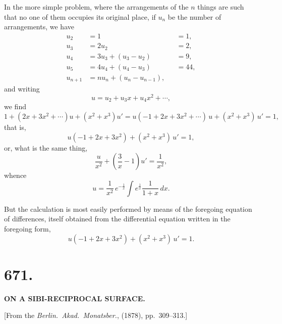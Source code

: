\documentclass[11pt,a4paper]{article}
\begin{document}
\medskip

In the more simple problem, where the arrangements of the $n$ things are such that no one of them occupies its original place, if $u_{n}$ be the number of arrangements, we have
\begin{align*}
u_{2} &= 1 &&= 1,\\
u_{3} &= 2u_{2} &&= 2,\\
u_{4} &= 3u_{3} + (u_{3} - u_{2}) &&= 9,\\
u_{5} &= 4u_{4} + (u_{4} - u_{3}) &&= 44,\\
u_{n+1} &= n u_{n} + (u_{n} - u_{n-1}),
\end{align*}
and writing
\[
u = u_{2} + u_{3}x + u_{4}x^{2} + \cdots,
\]
we find
\[
1 + (2x + 3x^{2} + \cdots)u + (x^{2} + x^{3})u' = u(-1 + 2x + 3x^{2} + \cdots)\,u + (x^{2} + x^{3})\,u' = 1,
\]
that is,
\[
u\left(-1 + 2x + 3x^{2}\right) + (x^{2} + x^{3})\,u' = 1,
\]
or, what is the same thing,
\[
\frac{u}{x^{2}} + \left(\frac{3}{x} - 1\right)u' = \frac{1}{x^{2}},
\]
whence
\[
u = \frac{1}{x^{2}}\,e^{-\frac{1}{x}}\int e^{\frac{1}{x}}\frac{1}{1 + x}\,dx.
\]

\medskip

But the calculation is most easily performed by means of the foregoing equation of differences, itself obtained from the differential equation written in the foregoing form,
\[
u(-1 + 2x + 3x^{2}) + (x^{2} + x^{3})\,u' = 1.
\]

\newpage



\section*{671.}

\begin{center}
\textbf{ON A SIBI-RECIPROCAL SURFACE.}
\end{center}

\medskip

\begin{center}
[From the \emph{Berlin.\ Akad.\ Monatsber.}, (1878), pp.~309--313.]
\end{center}

\medskip
\end{document}
